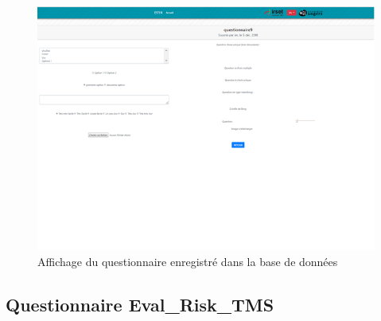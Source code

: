 \begin{figure}[H]
    \begin{center}
	\includegraphics[scale=0.7]{img/questionnaire/affichage}
    \end{center}
    \caption{Affichage du questionnaire enregistré dans la base de données}
\end{figure}

\subsection{Questionnaire Eval\_Risk\_TMS}
